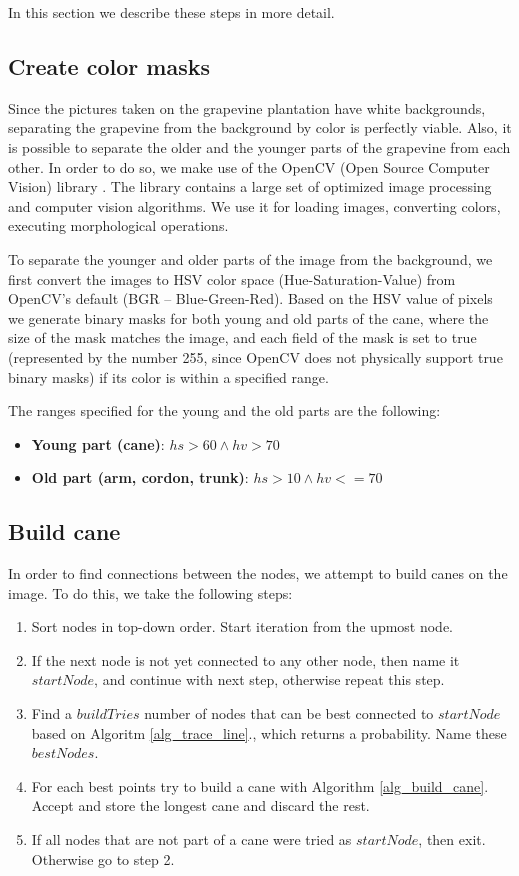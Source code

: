 \documentclass{PSAIE}%
\begin{document}
In this section we describe these steps in more detail.

\subsection{Create color masks} \label{sec_create_color_masks}
Since the pictures taken on the grapevine plantation have white backgrounds, separating the grapevine
from the background by color is perfectly viable. Also, it is possible to separate the older and the
younger parts of the grapevine from each other. In order to do so, we make use of the OpenCV
(Open Source Computer Vision)
library \cite{opencv_library}. The library contains a large set of optimized image processing and computer
vision algorithms. We use it for loading images, converting colors, executing morphological operations.

To separate the younger and older parts of the image from the background, we first convert the images
to HSV color space (Hue-Saturation-Value) from OpenCV's default (BGR -- Blue-Green-Red). Based on the
HSV value of pixels we generate binary masks for both young and old parts of the cane, where the size
of the mask matches the image, and each field of the mask is set to true (represented by the number 255,
since OpenCV does not physically support true binary masks) if its color is within a specified range.

The ranges specified for the young and the old parts are the following:

\begin{itemize}
      \item \textbf{Young part (cane)}: $hs > 60 \wedge hv > 70$
      \item \textbf{Old part (arm, cordon, trunk)}: $hs > 10 \wedge hv <= 70$
\end{itemize}

\subsection{Build cane} \label{sec_build_cane}
In order to find connections between the nodes, we attempt to build canes on the image. To do this,
we take the following steps:
\begin{enumerate}
      \item Sort nodes in top-down order. Start iteration from the upmost node.
      \item If the next node is not yet connected to any other node, then name it $startNode$, and continue
            with next step, otherwise repeat this step.
      \item Find a $buildTries$ number of nodes that can be best connected to $startNode$ based on Algoritm
            \ref{alg_trace_line}., which returns a probability. Name these $bestNodes$.
      \item For each best points try to build a cane with Algorithm \ref{alg_build_cane}.
            Accept and store the longest cane and discard the rest.
      \item If all nodes that are not part of a cane were tried as $startNode$, then exit. Otherwise go to step
            2.
\end{enumerate}
\end{document}
